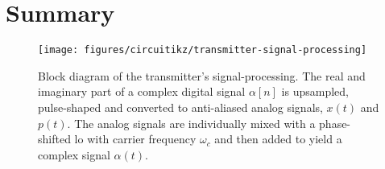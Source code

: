 \section*{Summary}

\begin{figure}[htb]
	\centering
	\texttt{[image: figures/circuitikz/transmitter-signal-processing]}
	\caption{Block diagram of the transmitter's signal-processing. The real and imaginary part of a complex digital signal $\alpha[n]$ is upsampled, pulse-shaped and converted to anti-aliased analog signals, $x(t)$ and $p(t)$. The analog signals are individually mixed with a phase-shifted \gls{lo} with carrier frequency $\omega_c$ and then added to yield a complex signal $\alpha(t)$.}\label{fig:transmitter_signal_processing}
\end{figure}